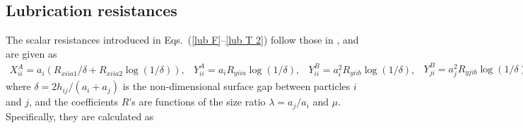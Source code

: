 \subsection{Lubrication resistances} \label{app: scalar resist}

The scalar resistances introduced in Eqs.\ (\ref{lub F}--\ref{lub T 2}) follow those in \cite{kim_karrila,Cheal_Ness_2018}, and are given as
\begin{subequations}
  \begin{equation}  \label{eq:lub79}
    \begin{aligned}
      X_{ii}^A = a_i (R_{xiia1}/\delta + R_{xiia2} \log(1/\delta)),
    \end{aligned}
  \end{equation}
  \begin{equation} 
    \begin{aligned}
      Y_{ii}^A = a_i  R_{yiia} \log(1/\delta),
    \end{aligned}
  \end{equation}
  \begin{equation} 
    \begin{aligned}
      Y_{ii}^B = a_i^2  R_{yiib} \log(1/\delta),
    \end{aligned}
  \end{equation}
  \begin{equation} 
    \begin{aligned}
      Y_{ji}^B = a_j^2  R_{yjib} \log(1/\delta),
    \end{aligned}
  \end{equation}
  \begin{equation} 
    \begin{aligned}
      Y_{ii}^C = a_i^3  R_{yiic} \log(1/\delta),
    \end{aligned}
  \end{equation}
  \begin{equation} 
    \begin{aligned}
      Y_{ij}^C = Y_{ji}^C = a_i^3  R_{yijc} \log(1/\delta),
    \end{aligned}
  \end{equation}
  \begin{equation} 
    \begin{aligned}
      Y_{jj}^C = a_j^3  R_{yjjc} \log(1/\delta),
    \end{aligned}
  \end{equation}
\end{subequations}
where $\delta=2h_{ij}/(a_i+a_j)$ is the non-dimensional surface gap between particles $i$ and $j$, and the coefficients $R$'s are functions of the size ratio $\lambda=a_j/a_i$ and $\mu$. Specifically, they are calculated as

